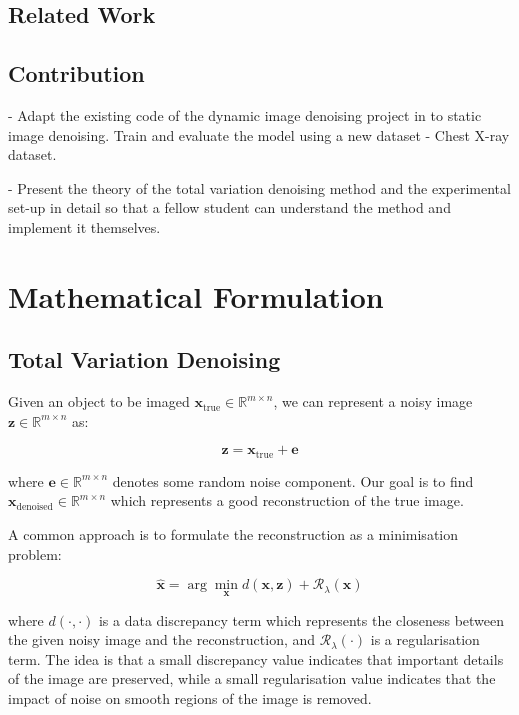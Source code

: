 \documentclass[12pt]{article}
\begin{document}
\subsection{Related Work}


\subsection{Contribution}

- Adapt the existing code of the dynamic image denoising project in \cite{kofler2023learning} to static image denoising. Train and evaluate the model using a new dataset - Chest X-ray dataset.

- Present the theory of the total variation denoising method and the experimental set-up in detail so that a fellow student can understand the method and implement it themselves.


\section{Mathematical Formulation}


\subsection{Total Variation Denoising}


Given an object to be imaged $\mathbf{x}_{\text{true}} \in \mathbb{R}^{m \times n}$, we can represent a noisy image $\mathbf{z} \in \mathbb{R}^{m \times n}$ as:


\begin{equation}
  \mathbf{z} = \mathbf{x}_{\text{true}} + \mathbf{e}
\end{equation}
  
where 
$\mathbf{e} \in \mathbb{R}^{m \times n}$ denotes some random noise component.
Our goal is to find $\mathbf{x}_{\text{denoised}} \in \mathbb{R}^{m \times n}$ which represents a good reconstruction of the true image.

A common approach is to formulate the reconstruction as a minimisation problem:


\begin{equation}
  \hat{\mathbf{x}} = \arg \min_{\mathbf{x}} d(\mathbf{x}, \mathbf{z}) + \mathcal{R}_{\lambda}(\mathbf{x})
\end{equation}

where $d(\cdot, \cdot)$ is a data discrepancy term 
which represents the closeness between the given noisy image and the reconstruction, 
and $\mathcal{R}_{\lambda}(\cdot)$ is a regularisation term.
The idea is that a small discrepancy value indicates that important details of the image are preserved, while a small regularisation value indicates that the impact of noise on smooth regions of the image is removed.
\end{document}
